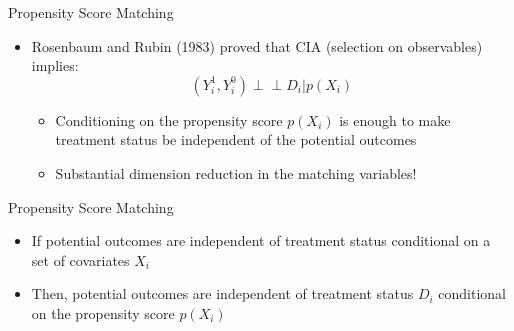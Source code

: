 \documentclass[hyperref={pdfpagelabels=false}]{beamer}
\newcommand{\indep}{\perp\!\!\!\perp}
\begin{document}
\begin{frame}{Propensity Score Matching}
\begin{itemize}

\item Rosenbaum and Rubin (1983) proved that CIA (selection on observables) implies:
	\begin{equation*}
	(Y^{1}_{i},Y^{0}_{i})\indep D_{i}|p(X_{i})
	\end{equation*}
\begin{itemize}
\item Conditioning on the propensity score $p(X_{i})$ is enough to make treatment status be independent of the potential outcomes

\vspace{0.2cm}
\item Substantial dimension reduction in the matching variables!
\end{itemize}
\end{itemize}
\end{frame}



\begin{frame}{Propensity Score Matching}
\begin{itemize}

\begin{block}{Propensity Score Theorem}
Suppose the CIA holds, such that $ (\mathrm{Y}^{1}_{i},\mathrm{Y}^{0}_{i})\indep D_{i}|X_{i}$. Then $ (\mathrm{Y}^{1}_{i},\mathrm{Y}^{0}_{i})\indep D_{i}|p(X_{i})$
\end{block}

\item If potential outcomes are independent of treatment status
conditional on a set of covariates $X_{i}$
\vspace{0.2cm}
\item Then, potential outcomes are independent of treatment status $D_{i}$ conditional on the propensity score $p(X_{i})$
\end{itemize}
\end{frame}
\end{document}
